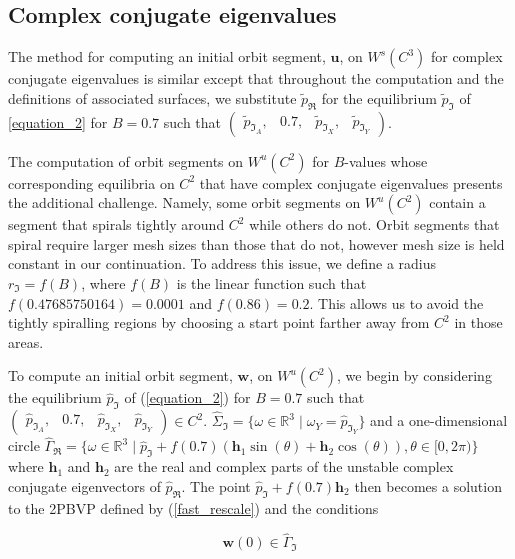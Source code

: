 \documentclass{ws-ijbc}
\begin{document}
\subsection{Complex conjugate eigenvalues}

The method for computing an initial orbit segment, $\mathbf{u}$, on $W^{s}(C^3)$ for complex conjugate eigenvalues is similar except that throughout the computation and the definitions of associated surfaces, we substitute $\tilde{p}_{\Re}$ for the equilibrium $\tilde{p}_{\Im}$ of \ref{equation_2} for $B=0.7$ such that $\begin{pmatrix}\tilde{p}_{\Im_A}, &0.7, &\tilde{p}_{\Im_X}, &\tilde{p}_{\Im_Y} \end{pmatrix}$.

The computation of orbit segments on $W^u(C^2)$ for $B$-values whose corresponding equilibria on $C^2$ that have complex conjugate eigenvalues presents the additional challenge.  Namely, some orbit segments on $W^u(C^2)$ contain a segment that spirals tightly around $C^2$ while others do not.  Orbit segments that spiral require larger mesh sizes than those that do not, however mesh size is held constant in our continuation.  To address this issue, we define a radius $r_{\Im} =  f(B)$, where $f(B)$ is the linear function such that $f(0.47685750164)=0.0001$ and $f(0.86)=0.2$.  This allows us to avoid the tightly spiralling regions by choosing a start point farther away from $C^2$ in those areas.

To compute an initial orbit segment, $\mathbf{w}$, on $W^u(C^2)$, we begin by considering the equilibrium $\hat{p}_{\Im}$ of (\ref{equation_2}) for $B=0.7$ such that $\begin{pmatrix} \hat{p}_{\Im_A},& 0.7,&\hat{p}_{\Im_X},&\hat{p}_{\Im_Y} \end{pmatrix} \in C^2$.  $\widehat{\Sigma}_{\Im} = \{ \omega \in \mathbb{R}^3  \; | \; \omega_Y = \hat{p}_{\Im_Y} \}$ and a one-dimensional circle $\widehat{\Gamma}_{\Re}= \{ \omega \in \mathbb{R}^3  \; | \; \hat{p}_{\Im} + f(0.7)(\mathbf{h}_1\sin(\theta) + \mathbf{h}_2\cos(\theta)), \theta \in [0,2\pi) \}$  where $\mathbf{h}_1$ and $\mathbf{h}_2$ are the real and complex parts of the unstable complex conjugate eigenvectors of $\hat{p}_{\Re}$.  The point $\hat{p}_{\Im} + f(0.7)\mathbf{h}_2$ then becomes a solution to the 2PBVP defined by (\ref{fast_rescale}) and the conditions

\begin{equation}
	\mathbf{w}(0) \in \widehat{\Gamma}_{\Im}
	\label{bottom_start_complex}
\end{equation}
\end{document}

